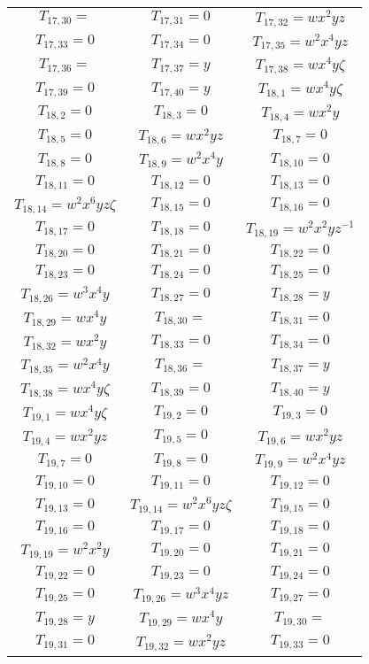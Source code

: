 \documentclass[12pt]{memoireuqam1.3}
\begin{document}
\begin{longtable}{|c|c|c|}
$T_{17,30}= $&
$T_{17,31}= 0$&
$T_{17,32}= wx^2yz$\\
$T_{17,33}= 0$&
$T_{17,34}= 0$&
$T_{17,35}= w^2x^4yz$\\
$T_{17,36}= $&
$T_{17,37}= y$&
$T_{17,38}= wx^4y\zeta$\\
$T_{17,39}= 0$&
$T_{17,40}= y$&
$T_{18,1}= wx^4y\zeta$\\
$T_{18,2}= 0$&
$T_{18,3}= 0$&
$T_{18,4}= wx^2y$\\
$T_{18,5}= 0$&
$T_{18,6}= wx^2yz$&
$T_{18,7}= 0$\\
$T_{18,8}= 0$&
$T_{18,9}= w^2x^4y$&
$T_{18,10}= 0$\\
$T_{18,11}= 0$&
$T_{18,12}= 0$&
$T_{18,13}= 0$\\
$T_{18,14}= w^2x^6yz\zeta$&
$T_{18,15}= 0$&
$T_{18,16}= 0$\\
$T_{18,17}= 0$&
$T_{18,18}= 0$&
$T_{18,19}= w^2x^2yz^{-1}$\\
$T_{18,20}= 0$&
$T_{18,21}= 0$&
$T_{18,22}= 0$\\
$T_{18,23}= 0$&
$T_{18,24}= 0$&
$T_{18,25}= 0$\\
$T_{18,26}= w^3x^4y$&
$T_{18,27}= 0$&
$T_{18,28}= y$\\
$T_{18,29}= wx^4y$&
$T_{18,30}= $&
$T_{18,31}= 0$\\
$T_{18,32}= wx^2y$&
$T_{18,33}= 0$&
$T_{18,34}= 0$\\
$T_{18,35}= w^2x^4y$&
$T_{18,36}= $&
$T_{18,37}= y$\\
$T_{18,38}= wx^4y\zeta$&
$T_{18,39}= 0$&
$T_{18,40}= y$\\
$T_{19,1}= wx^4y\zeta$&
$T_{19,2}= 0$&
$T_{19,3}= 0$\\
$T_{19,4}= wx^2yz$&
$T_{19,5}= 0$&
$T_{19,6}= wx^2yz$\\
$T_{19,7}= 0$&
$T_{19,8}= 0$&
$T_{19,9}= w^2x^4yz$\\
$T_{19,10}= 0$&
$T_{19,11}= 0$&
$T_{19,12}= 0$\\
$T_{19,13}= 0$&
$T_{19,14}= w^2x^6yz\zeta$&
$T_{19,15}= 0$\\
$T_{19,16}= 0$&
$T_{19,17}= 0$&
$T_{19,18}= 0$\\
$T_{19,19}= w^2x^2y$&
$T_{19,20}= 0$&
$T_{19,21}= 0$\\
$T_{19,22}= 0$&
$T_{19,23}= 0$&
$T_{19,24}= 0$\\
$T_{19,25}= 0$&
$T_{19,26}= w^3x^4yz$&
$T_{19,27}= 0$\\
$T_{19,28}= y$&
$T_{19,29}= wx^4y$&
$T_{19,30}= $\\
$T_{19,31}= 0$&
$T_{19,32}= wx^2yz$&
$T_{19,33}= 0$\\

\end{longtable}
\end{document}

